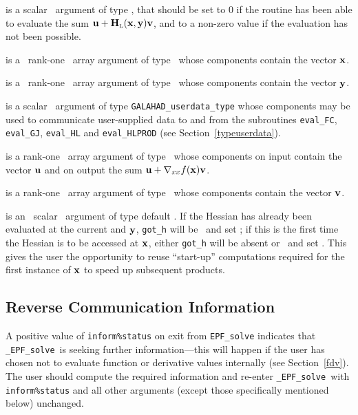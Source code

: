 \documentclass{galahad}
\newcommand{\packagename}{EPF}
\newcommand{\fullpackagename}{\libraryname\_\packagename}
\newcommand{\solver}{{\tt \fullpackagename\_solve}}
\newcommand{\bmHL}{\bmH\sub{L}}
\begin{document}
\begin{description}
 is a scalar \intentout\ argument of type \integer,
that should be set to 0 if the routine has been able to evaluate the
sum $\bmu + \bmHL(\bmx,\bmy) \bmv$,
and to a non-zero value if the evaluation has not been possible.

 is a \ rank-one \intentin\ array argument of type
\realdp\ whose components contain the vector ${\mathbf{x}}$.

 is a \ rank-one \intentin\ array argument of type
\realdp\ whose components contain the vector ${\mathbf{y}}$.

 is a scalar \intentinout\ argument of type
{\tt GALAHAD\_userdata\_type} whose components may be used
to communicate user-supplied data to and from the
subroutines {\tt eval\_FC}, {\tt eval\_GJ},
{\tt eval\_HL} and {\tt eval\_HLPROD}
(see Section~\ref{typeuserdata}).

 is a rank-one \intentinout\ array argument of type \realdp\
whose components on input contain the vector ${\mathbf{u}}$ and on output the
sum ${\mathbf{u}} + \nabla_{xx} f({\mathbf{x}}) {\mathbf{v}}$.

 is a rank-one \intentin\ array argument of type \realdp\
whose components contain the vector ${\mathbf{v}}$.

 is an \optional\ scalar \intentin\ argument of type default
\logical. If the Hessian has already been evaluated at the current 
and ${\mathbf{y}}$, {\tt got\_h} will be \present\ and set \true; if this is the 
first time the Hessian is to be accessed at ${\mathbf{x}}$, either {\tt got\_h} 
will be absent
or \present\ and set \false. This gives the user the opportunity
to reuse ``start-up'' computations required for the first instance of
${\mathbf{x}}$ to speed up subsequent products.

\end{description}



\subsection{\label{reverse}Reverse Communication Information}

A positive value of {\tt inform\%status} on exit from
{\tt \packagename\_solve}
indicates that
\solver\ is seeking further information---this will happen
if the user has chosen not to evaluate function or
derivative values internally (see Section~\ref{fdv}).
The user should compute the required information and re-enter \solver\
with {\tt inform\%status} and all other arguments (except those specifically
mentioned below) unchanged.
\end{document}
